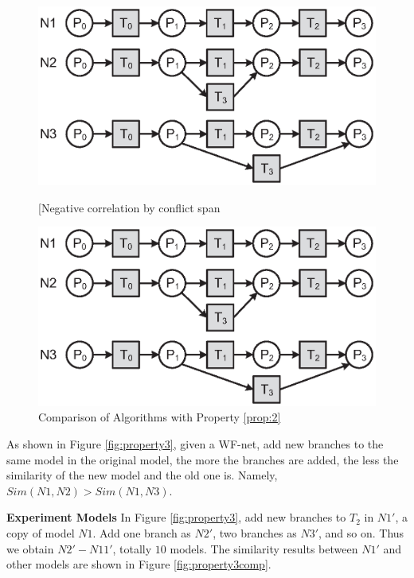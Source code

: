 \documentclass{llncs}
\begin{document}
\begin{figure}[ht]
\centering
\begin{minipage}[t]{0.45\textwidth}
	\centering
	\includegraphics[width=1\textwidth]{fig_property_2.eps}
	\caption{[Negative correlation by conflict span}
	\label{fig:property2}
\end{minipage}
\hspace{0.1in}
\begin{minipage}[t]{0.45\textwidth}
	\centering
	\includegraphics[width=1\textwidth]{fig_property_2.eps}
	\caption{Comparison of Algorithms with Property \ref{prop:2}}
	\label{fig:property2comp}
\end{minipage}
\end{figure}

\begin{property}\label{prop:3}
As shown in Figure \ref{fig:property3}, given a WF-net, add new branches to the same model in the original model, the more the branches are added, the less the similarity of the new model and the old one is. Namely, $Sim(N1,N2)>Sim(N1,N3)$.
\end{property}
\textbf{Experiment Models} In Figure \ref{fig:property3}, add new branches to $T_{2}$ in $N1'$, a copy of model $N1$. Add one branch as $N2'$, two branches as $N3'$, and so on. Thus we obtain $N2'-N11'$, totally $10$ models. The similarity results between $N1'$ and other models are shown in Figure \ref{fig:property3comp}.
\end{document}
